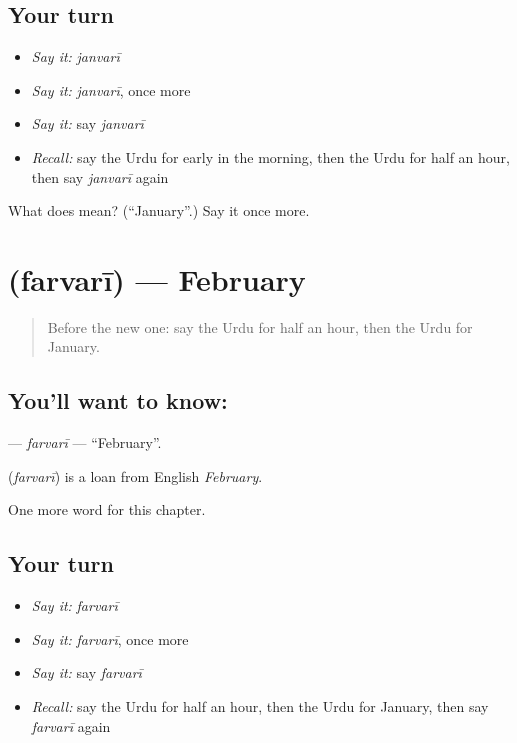 \subsection*{Your turn}
\begin{itemize}
\raggedright
  \item \emph{Say it:} \emph{janvarī}
  \item \emph{Say it:} \emph{janvarī}, once more
  \item \emph{Say it:} say \emph{janvarī}
  \item \emph{Recall:} say the Urdu for early in the morning, then the Urdu for half an hour, then say \emph{janvarī} again
\end{itemize}

\begin{tcolorbox}[breakable,colback=teal!4,colframe=teal!35!black,title={Before you move on}]
What does  mean? (\textquotedblleft{}January\textquotedblright{}.) Say it once more.
\end{tcolorbox}
\section[\texorpdfstring{\ur{فروری} (farvarī)}{فروری (farvarī)}]{ (farvarī) — February}

\label{lesson:UR-C155-farvari}



\begin{quote}
Before the new one: say the Urdu for half an hour, then the Urdu for January.
\end{quote}

\subsection*{You'll want to know: }
\textbf{} — \emph{farvarī} — \textquotedblleft{}February\textquotedblright{}.

\begin{cousinweb}
\textbf{} (\emph{farvarī}) is a loan from English \emph{February}.
\end{cousinweb}

\begin{grammarlens}[title={What you've built}]
One more word for this chapter.
\end{grammarlens}

\subsection*{Your turn}
\begin{itemize}
\raggedright
  \item \emph{Say it:} \emph{farvarī}
  \item \emph{Say it:} \emph{farvarī}, once more
  \item \emph{Say it:} say \emph{farvarī}
  \item \emph{Recall:} say the Urdu for half an hour, then the Urdu for January, then say \emph{farvarī} again
\end{itemize}

